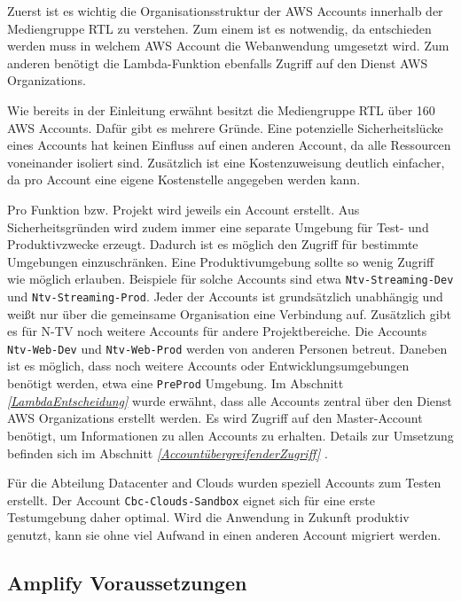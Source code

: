 Zuerst ist es wichtig die Organisationsstruktur der AWS Accounts innerhalb der Mediengruppe RTL zu verstehen.
Zum einem ist es notwendig, da entschieden werden muss in welchem AWS Account die Webanwendung umgesetzt wird.
Zum anderen benötigt die Lambda-Funktion ebenfalls Zugriff auf den Dienst AWS Organizations.

Wie bereits in der Einleitung erwähnt besitzt die Mediengruppe RTL über 160 AWS Accounts.
Dafür gibt es mehrere Gründe.
Eine potenzielle Sicherheitslücke eines Accounts hat keinen Einfluss auf einen anderen Account, da alle Ressourcen voneinander isoliert sind.
Zusätzlich ist eine Kostenzuweisung deutlich einfacher, da pro Account eine eigene Kostenstelle angegeben werden kann.

Pro Funktion bzw. Projekt wird jeweils ein Account erstellt.
Aus Sicherheitsgründen wird zudem immer eine separate Umgebung für Test- und Produktivzwecke erzeugt.
Dadurch ist es möglich den Zugriff für bestimmte Umgebungen einzuschränken.
Eine Produktivumgebung sollte so wenig Zugriff wie möglich erlauben.
Beispiele für solche Accounts sind etwa \verb+Ntv-Streaming-Dev+ und \verb+Ntv-Streaming-Prod+.
Jeder der Accounts ist grundsätzlich unabhängig und weißt nur über die gemeinsame Organisation eine Verbindung auf.
Zusätzlich gibt es für N-TV noch weitere Accounts für andere Projektbereiche.
Die Accounts \verb+Ntv-Web-Dev+ und \verb+Ntv-Web-Prod+ werden von anderen Personen betreut.
Daneben ist es möglich, dass noch weitere Accounts oder Entwicklungsumgebungen benötigt werden, etwa eine \verb+PreProd+ Umgebung.
\clearpage
Im Abschnitt \textit{\ref{LambdaEntscheidung} } wurde erwähnt, dass alle Accounts zentral über den Dienst AWS Organizations erstellt werden.
Es wird Zugriff auf den Master-Account benötigt, um Informationen zu allen Accounts zu erhalten.
Details zur Umsetzung befinden sich im Abschnitt \textit{\ref{AccountübergreifenderZugriff} }.

Für die Abteilung Datacenter and Clouds wurden speziell Accounts zum Testen erstellt.
Der Account \verb+Cbc-Clouds-Sandbox+ eignet sich für eine erste Testumgebung daher optimal.
Wird die Anwendung in Zukunft produktiv genutzt, kann sie ohne viel Aufwand in einen anderen Account migriert werden.

\subsection{Amplify Voraussetzungen}

